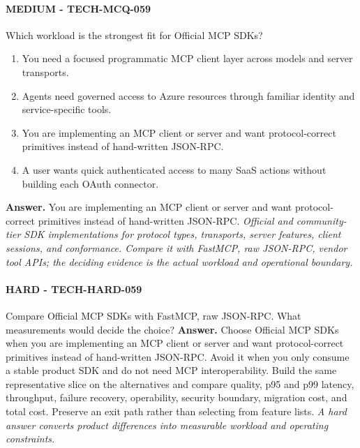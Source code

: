 \paragraph{MEDIUM - TECH-MCQ-059} Which workload is the strongest fit for Official MCP SDKs?
\begin{enumerate}[label=\Alph*.]
\item You need a focused programmatic MCP client layer across models and server transports.
\item Agents need governed access to Azure resources through familiar identity and service-specific tools.
\item You are implementing an MCP client or server and want protocol-correct primitives instead of hand-written JSON-RPC.
\item A user wants quick authenticated access to many SaaS actions without building each OAuth connector.
\end{enumerate}
\textbf{Answer.} You are implementing an MCP client or server and want protocol-correct primitives instead of hand-written JSON-RPC.
\textit{Official and community-tier SDK implementations for protocol types, transports, server features, client sessions, and conformance. Compare it with FastMCP, raw JSON-RPC, vendor tool APIs; the deciding evidence is the actual workload and operational boundary.}
\paragraph{HARD - TECH-HARD-059} Compare Official MCP SDKs with FastMCP, raw JSON-RPC. What measurements would decide the choice?
\textbf{Answer.} Choose Official MCP SDKs when you are implementing an MCP client or server and want protocol-correct primitives instead of hand-written JSON-RPC. Avoid it when you only consume a stable product SDK and do not need MCP interoperability. Build the same representative slice on the alternatives and compare quality, p95 and p99 latency, throughput, failure recovery, operability, security boundary, migration cost, and total cost. Preserve an exit path rather than selecting from feature lists.
\textit{A hard answer converts product differences into measurable workload and operating constraints.}

